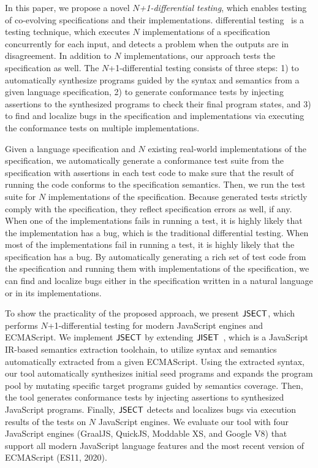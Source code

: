 In this paper, we propose a novel \textit{$N$+1-differential testing},
which enables testing of co-evolving specifications and their implementations.
differential testing~\cite{nversion} is a testing technique, which
executes $N$ implementations of a specification concurrently for each
input, and detects a problem when the outputs are in disagreement.
In addition to $N$ implementations, our approach tests the
specification as well.  The $N$+1-differential testing
consists of three steps: 1) to automatically synthesize
programs guided by the syntax and semantics from a given language
specification, 2) to generate conformance tests by injecting
assertions to the synthesized programs
to check their final program states, and 3) to find and localize bugs in
the specification and implementations via executing the conformance tests on multiple implementations.

Given a language specification and $N$ existing real-world
implementations of the specification, we
automatically generate a conformance test suite from the specification with
assertions in each test code to make sure that the result of running the code
conforms to the specification semantics.  Then, we run the test suite for $N$
implementations of the specification.  Because generated tests strictly comply
with the specification, they reflect specification errors as well, if any.  When
one of the implementations fails in running a test, it is highly likely that the
implementation has a bug, which is the traditional differential testing.  When
most of the implementations fail in running a test, it is highly likely that
the specification has a bug.  By automatically generating a rich set of test
code from the specification and running them with implementations of the
specification, we can find and localize bugs either in the specification written
in a natural language or in its implementations.

To show the practicality of the proposed approach, we present $\text{\sf JSECT}$, which
performs $N$+1-differential testing for modern JavaScript engines and ECMAScript.
We implement $\text{\sf JSECT}$ by extending $\text{\sf JISET}$~\cite{jiset}, which is a JavaScript
IR-based semantics extraction toolchain, to utilize syntax and semantics
automatically extracted from a given ECMAScript.  Using the extracted syntax,
our tool automatically synthesizes initial seed programs and expands the program
pool by mutating specific target programs guided by semantics coverage.  Then,
the tool generates conformance tests by injecting assertions to synthesized
JavaScript programs.  Finally, $\text{\sf JSECT}$ detects and localizes bugs via execution
results of the tests on $N$ JavaScript engines.  We evaluate our tool with four
JavaScript engines (GraalJS\cite{graaljs}, QuickJS\cite{qjs}, Moddable
XS\cite{xs}, and Google V8\cite{v8}) that support all modern JavaScript language
features and the most recent version of ECMAScript (ES11, 2020).

